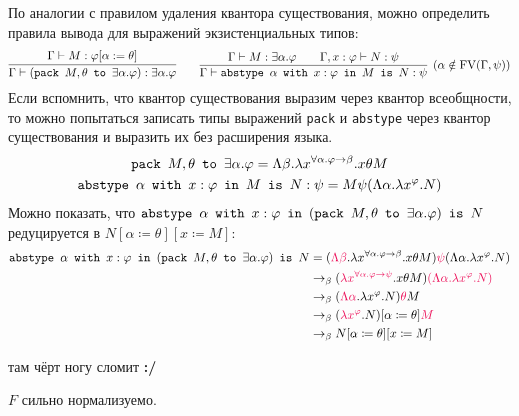 По аналогии с правилом удаления квантора существования, можно определить правила вывода для выражений экзистенциальных типов:
\[
    \infer{\Gamma\vdash (\pack{M, \theta}{\exists \alpha . \varphi}) : \exists \alpha.\varphi}
        {\Gamma \vdash M : \varphi[\alpha := \theta]} \qquad
    \infer[(\alpha \notin \FV(\Gamma, \psi))]
        {\Gamma \vdash \abstype{\alpha}{x:\varphi}{M}{N:\psi}}
        {\Gamma \vdash M : \exists \alpha . \varphi && \Gamma, x : \varphi \vdash N : \psi}
\]
Если вспомнить, что квантор существования выразим через квантор всеобщности, то можно попытаться записать типы выражений
\texttt{pack} и \texttt{abstype} через квантор существования и выразить их без расширения языка.
\begin{gather*}
    \mathinner{\mathtt{pack}}~M, \theta~\mathinner{\mathtt{to}}~\exists \alpha . \varphi =
        \Lambda \beta . \lambda x^{\forall \alpha . \varphi \rightarrow \beta} . x \theta M \\
    \mathinner{\mathtt{abstype}}~\alpha~\mathinner{\mathtt{with}}~x : \varphi~\mathinner{\mathtt{in}}~M~\mathinner{\mathtt{is}}~N:\psi =
        M \psi (\Lambda \alpha . \lambda x ^ \varphi . N)
\end{gather*}
Можно показать, что $\mathinner{\mathtt{abstype}}~\alpha~\mathinner{\mathtt{with}}~x:\varphi~\mathinner{\mathtt{in}}~(\mathinner{\mathtt{pack}}~M,\theta~\mathinner{\mathtt{to}}~\exists\alpha .\varphi)~\mathinner{\mathtt{is}}~N$
        редуцируется в $N[\alpha\coloneqq\theta][x\coloneqq M]$:
\begin{align*}
    \abstype{\alpha}{x:\varphi}{(\pack{M,\theta}{\exists\alpha .\varphi})}{N}
    &= (\reduction{\Lambda \beta} . \lambda x^{\forall \alpha . \varphi \rightarrow \beta} . x \theta M)
        \reduction{\psi} (\Lambda \alpha . \lambda x ^ \varphi . N) \\
    &\rightarrow_\beta (\reduction{\lambda x^{\forall \alpha . \varphi \rightarrow \psi}} . x \theta M)
        \reduction{(\Lambda \alpha . \lambda x ^ \varphi . N)} \\
    &\rightarrow_\beta (\reduction{\Lambda \alpha} . \lambda x^\varphi . N) \reduction\theta M \\
    &\rightarrow_\beta (\reduction{\lambda x^\varphi} . N)[\alpha\coloneqq\theta] \reduction M \\
    &\rightarrow_\beta N[\alpha\coloneqq\theta][x\coloneqq M]
\end{align*}

\begin{example} \todo там чёрт ногу сломит \textbf{:/}
\end{example}

\begin{statement}
    $F$ сильно нормализуемо.
\end{statement}

